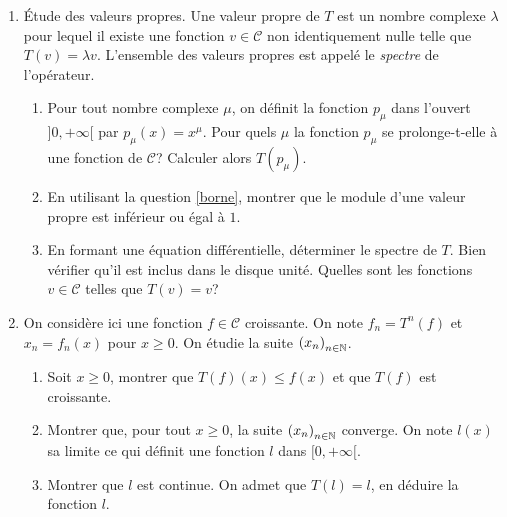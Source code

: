 \begin{enumerate}
 \item \'Etude des valeurs propres.\newline
Une valeur propre de $T$ est un nombre complexe $\lambda$ pour lequel il existe une fonction $v\in\mathcal{C}$ non identiquement nulle telle que $T(v)=\lambda v$. L'ensemble des valeurs propres est appelé le \emph{spectre} de l'opérateur.
\begin{enumerate}
  \item Pour tout nombre complexe $\mu$, on définit la fonction $p_\mu$ dans l'ouvert $]0,+\infty[$ par $p_\mu(x)=x^\mu$. Pour quels $\mu$ la fonction $p_\mu$ se prolonge-t-elle à une fonction de $\mathcal{C}$? Calculer alors $T(p_\mu)$.

 \item En utilisant la question \ref{borne}, montrer que le module d'une valeur propre est inférieur ou égal à $1$.
 \item En formant une équation différentielle, déterminer le spectre de $T$. Bien vérifier qu'il est inclus dans le disque unité. Quelles sont les fonctions $v\in \mathcal{C}$ telles que $T(v)= v$?
\end{enumerate}

 \item On considère ici une fonction $f\in\mathcal{C}$ croissante. On note $f_n=T^n(f)$ et $x_n = f_n(x)$ pour $x\geq 0$. On étudie la suite $\left( x_n\right) _{n\in \mathbb{N}}$.
\begin{enumerate}
 \item Soit $x\geq 0$, montrer que $T(f)(x) \leq f(x)$ et que $T(f)$ est croissante.
 \item Montrer que, pour tout $x\geq0$, la suite $\left( x_n\right) _{n\in \mathbb{N}}$ converge. On note $l(x)$ sa limite ce qui définit une fonction $l$ dans $[0,+\infty[$.
 \item Montrer que $l$ est continue. On admet que $T(l) = l$, en déduire la fonction $l$. 
\end{enumerate}


\end{enumerate}
 
